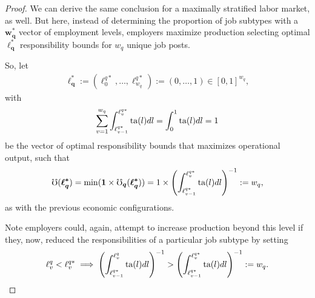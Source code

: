 \documentclass[hidelinks, nonatbib]{elsarticle}
\begin{document}
\begin{lemma}
\begin{proof}
        We can derive the same conclusion for a maximally stratified labor market, as well. But here, instead of determining the proportion of job subtypes with a $\boldsymbol{w_{q}^{*}}$ vector of employment levels, employers maximize production selecting optimal $\boldsymbol{\ell_{q}^{*}}$ responsibility bounds for $w_q$ unique job posts.
        
        So, let 
        \begin{gather}
            \boldsymbol{\ell_{q}^{*}}
            :=
            (\ell_{0}^{q*}, \dots, \ell_{w_q}^{q*})
            :=
            (0, \dots, 1) 
            \in [0,1]^{w_q}
            ,
        \end{gather}
        with
        \begin{gather}
        \sum_{v=1}^{w_q}
        \int_{
            \ell_{v-1}^{q*}
        }^{
            \ell_{v}^{q*}
        }
        \text{ta}(l)dl
        =
        \int_{0}^{1}
        \text{ta}(l)dl
        =
        1
        \end{gather}
        be the vector of optimal responsibility bounds that maximizes operational output, such that
        \begin{gather}
            \mho(\boldsymbol{\ell_{q}^{*}})
            =
            \min(
                \boldsymbol{1}
                \times
                \boldsymbol{\mho_q}(
                    \boldsymbol{\ell_{q}^{*}}
                )
            )
            =
            1
            \times
            \left(
                \int_{
                    \ell_{v-1}^{q*}
                }^{
                    \ell_{v}^{q*}
                }
                \text{ta}(l)dl
            \right) ^ {-1}
            :=
            w_q
            ,
        \end{gather}
        as with the previous economic configurations.
        
        Note employers could, again, attempt to increase production beyond this level if they, now, reduced the responsibilities of a particular job subtype by setting
        \begin{align}
        \ell_{v}^{q} < \ell_{v}^{q*}
        \implies
            \left(
                \int_{
                    \ell_{v-1}^{q*}
                }^{
                    \ell_{v}^{q}
                }
                \text{ta}(l)dl
            \right) ^ {-1}
            >
            \left(
                \int_{
                    \ell_{v-1}^{q*}
                }^{
                    \ell_{v}^{q*}
                }
                \text{ta}(l)dl
            \right) ^ {-1}
            :=
            w_q
            .
        \end{align}
        

\end{proof}
\end{lemma}
\end{document}
